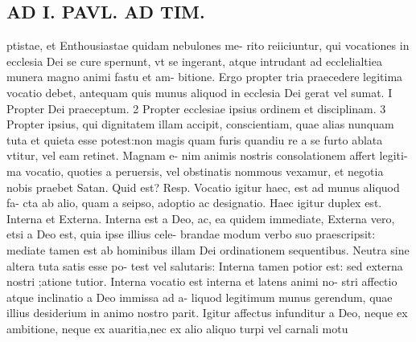 \documentclass{article}
\begin{document}
\begin{pages}
\section*{AD I. PAVL. AD TIM. }
\marginpar{[ p.STF. ]}\pstart ptistae, et Enthousiastae quidam nebulones me- rito reiiciuntur, qui vocationes in ecclesia Dei se cure spernunt, vt se ingerant, atque intrudant ad ecclelialtiea munera magno animi fastu et am- bitione.  \pend\pstart Ergo propter tria praecedere legitima vocatio debet, antequam quis munus aliquod in ecclesia Dei gerat vel sumat. I Propter Dei praeceptum. 2 Propter ecclesiae ipsius ordinem et disciplinam. 3 Propter ipsius, qui dignitatem illam accipit, conscientiam, quae alias nunquam tuta et quieta esse potest:non magis quam furis quandiu re a se furto ablata vtitur, vel eam retinet. Magnam e- nim animis nostris consolationem affert legiti- ma vocatio, quoties a peruersis, vel obstinatis nommous vexamur, et negotia nobis praebet Satan. Quid est? Resp.  \pend\pstart Vocatio igitur haec, est ad munus aliquod fa- cta ab alio, quam a seipso, adoptio ac designatio. Haec igitur duplex est. Interna et Externa.  \pend\pstart Interna est a Deo, ac, ea quidem immediate, Externa vero, etsi a Deo est, quia ipse illius cele- brandae modum verbo suo praescripsit: mediate tamen est ab hominibus illam Dei ordinationem sequentibus. Neutra sine altera tuta satis esse po- test vel salutaris: Interna tamen potior est: sed externa nostri ;atione tutior.  \pend\pstart Interna vocatio est interna et latens animi no- stri affectio atque inclinatio a Deo immissa ad a- liquod legitimum munus gerendum, quae illius desiderium in animo nostro parit. Igitur affectus infunditur a Deo, neque ex ambitione, neque ex auaritia,nec ex alio aliquo turpi vel carnali motu  \pend

\end{pages}
\end{document}
